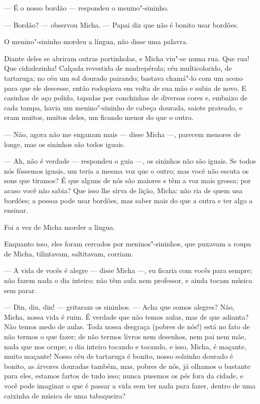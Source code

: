--- É o nosso bordão --- respondeu o menino"-sininho.

--- Bordão? --- observou Micha. --- Papai diz que não é bonito usar
bordões.

O menino"-sininho mordeu a língua, não disse uma palavra.

Diante deles se abriram outras portinholas, e Micha viu"-se numa rua. Que
rua! Que cidadezinha! Calçada revestida de madrepérola; céu
multicolorido, de tartaruga; no céu um sol dourado pairando; bastava
chamá"-lo com um aceno para que ele descesse, então rodopiava em volta de
sua mão e subia de novo. E casinhas de aço polido, tapadas por
conchinhas de diversas cores e, embaixo de cada tampa, havia um
menino"-sininho de cabeça dourada, saiote prateado, e eram muitos, muitos
deles, um ficando menor do que o outro.

--- Não, agora não me enganam mais --- disse Micha ---, parecem menores
de longe, mas os sininhos são todos iguais.

--- Ah, não é verdade --- respondeu o guia ---, os sininhos não são
iguais. Se todos nós fôssemos iguais, um teria a mesma voz que o outro;
mas você não escuta os sons que tiramos? É que alguns de nós são maiores
e têm a voz mais grossa; por acaso você não sabia? Que isso lhe sirva de
lição, Micha: não ria de quem usa bordões; a pessoa pode usar bordões,
mas saber mais do que a outra e ter algo a ensinar.

Foi a vez de Micha morder a língua.

Enquanto isso, eles foram cercados por meninos"-sininhos, que puxavam a
roupa de Micha, tilintavam, saltitavam, corriam.

--- A vida de vocês é alegre --- disse Micha ---, eu ficaria com vocês
para sempre; não fazem nada o dia inteiro; não têm aula nem professor, e
ainda tocam música sem parar.

--- Din, din, din! --- gritaram os sininhos. --- Acha que somos alegres?
Não, Micha, nossa vida é ruim. É verdade que não temos aulas, mas de que
adianta? Não temos medo de aulas. Toda nossa desgraça (pobres de nós!)
está no fato de não termos o que fazer; de não termos livros nem
desenhos, nem pai nem mãe, nada que nos ocupe; o dia inteiro tocando e
tocando, e isso, Micha, é maçante, muito maçante! Nosso céu de tartaruga
é bonito, nosso solzinho dourado é bonito, as árvores douradas também,
mas, pobres de nós, já olhamos o bastante para eles, estamos fartos de
tudo isso; nunca pusemos os pés fora da cidade, e você pode imaginar o
que é passar a vida sem ter nada para fazer, dentro de uma caixinha de
música de uma tabaqueira?

